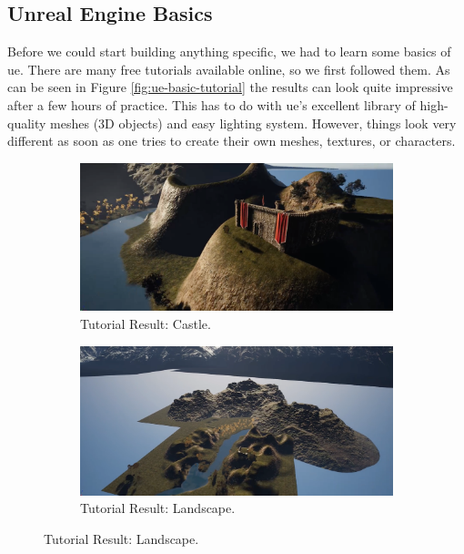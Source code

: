 \documentclass[
  a4paper,  %
  twoside,  %
  bibliography=totoc,
  headsepline,
  cleardoublepage=empty,
  parskip=half,
  draft=false
]{scrbook}
\begin{document}
\subsection*{Unreal Engine Basics}

Before we could start building anything specific, we had to learn some basics of \gls{ue}. There are many free tutorials available online, so we first followed them. As can be seen in Figure \ref{fig:ue-basic-tutorial} the results can look quite impressive after a few hours of practice. This has to do with \gls{ue}'s excellent library of high-quality meshes (3D objects) and easy lighting system. However, things look very different as soon as one tries to create their own meshes, textures, or characters.

\begin{figure}[h]
  \centering
  \begin{subfigure}{0.45\textwidth}
    \includegraphics[width=\linewidth]{graphics/unreal-engine/Basics/Landscape-Castle.png}
    \caption{Tutorial Result: Castle.}
  \end{subfigure}
  \begin{subfigure}{0.45\textwidth}
    \includegraphics[width=\linewidth]{graphics/unreal-engine/Basics/Landscape-Overview.png}
    \caption{Tutorial Result: Landscape.}
  \end{subfigure}


\end{figure}
\end{document}
